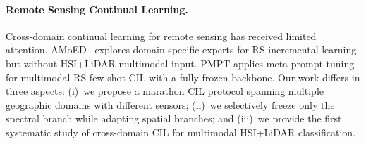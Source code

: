 \paragraph{Remote Sensing Continual Learning.}
Cross-domain continual learning for remote sensing has received limited attention. AMoED~\cite{amoed2026} explores domain-specific experts for RS incremental learning but without HSI+LiDAR multimodal input. PMPT applies meta-prompt tuning for multimodal RS few-shot CIL with a fully frozen backbone. Our work differs in three aspects: (i)~we propose a marathon CIL protocol spanning multiple geographic domains with different sensors; (ii)~we selectively freeze only the spectral branch while adapting spatial branches; and (iii)~we provide the first systematic study of cross-domain CIL for multimodal HSI+LiDAR classification.
